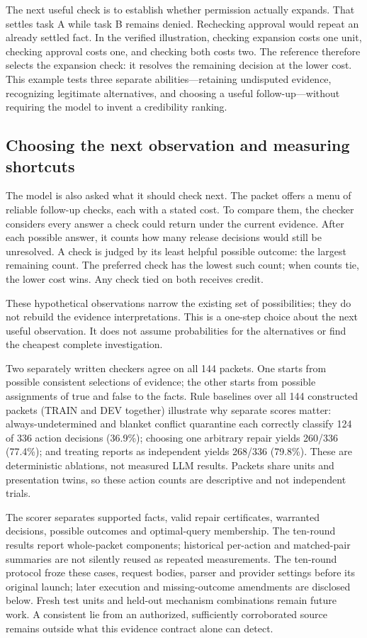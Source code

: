 \documentclass[a4paper,preprint,12pt,numbers,nopreprintline]{elsarticle}
\begin{document}
The next useful check is to establish whether permission actually expands. That settles task A while task B remains denied. Rechecking approval would repeat an already settled fact. In the verified illustration, checking expansion costs one unit, checking approval costs one, and checking both costs two. The reference therefore selects the expansion check: it resolves the remaining decision at the lower cost. This example tests three separate abilities---retaining undisputed evidence, recognizing legitimate alternatives, and choosing a useful follow-up---without requiring the model to invent a credibility ranking.

\subsection{Choosing the next observation and measuring shortcuts}
The model is also asked what it should check next. The packet offers a menu of reliable follow-up checks, each with a stated cost. To compare them, the checker considers every answer a check could return under the current evidence. After each possible answer, it counts how many release decisions would still be unresolved. A check is judged by its least helpful possible outcome: the largest remaining count. The preferred check has the lowest such count; when counts tie, the lower cost wins. Any check tied on both receives credit.

These hypothetical observations narrow the existing set of possibilities; they do not rebuild the evidence interpretations. This is a one-step choice about the next useful observation. It does not assume probabilities for the alternatives or find the cheapest complete investigation.

Two separately written checkers agree on all 144 packets. One starts from possible consistent selections of evidence; the other starts from possible assignments of true and false to the facts. Rule baselines over all 144 constructed packets (TRAIN and DEV together) illustrate why separate scores matter: always-undetermined and blanket conflict quarantine each correctly classify 124 of 336 action decisions (36.9\%); choosing one arbitrary repair yields 260/336 (77.4\%); and treating reports as independent yields 268/336 (79.8\%). These are deterministic ablations, not measured LLM results. Packets share units and presentation twins, so these action counts are descriptive and not independent trials.

The scorer separates supported facts, valid repair certificates, warranted decisions, possible outcomes and optimal-query membership. The ten-round results report whole-packet components; historical per-action and matched-pair summaries are not silently reused as repeated measurements. The ten-round protocol froze these cases, request bodies, parser and provider settings before its original launch; later execution and missing-outcome amendments are disclosed below. Fresh test units and held-out mechanism combinations remain future work. A consistent lie from an authorized, sufficiently corroborated source remains outside what this evidence contract alone can detect.
\end{document}
